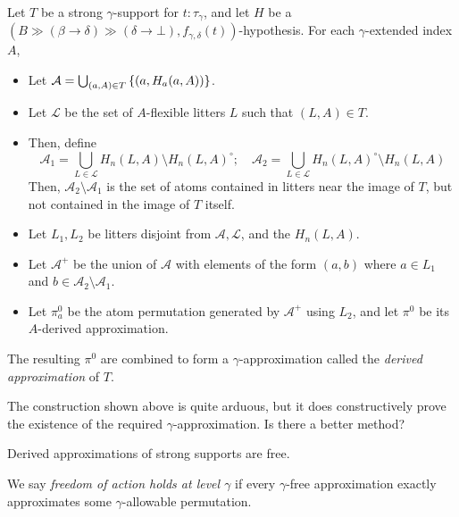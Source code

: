 \documentclass{article}
\begin{document}
\begin{definition}
    Let \( T \) be a strong \( \gamma \)-support for \( t : \tau_\gamma \), and let \( H \) be a \( (B \gg (\beta \longrightarrow \delta) \gg (\delta \longrightarrow \bot), f_{\gamma,\delta}(t)) \)-hypothesis.
    For each \( \gamma \)-extended index \( A \),
    \begin{itemize}
        \item Let \( \mathcal A = \bigcup_{(a, A) \in T} \qty{(a, H_a(a, A))} \).
        \item Let \( \mathcal L \) be the set of \( A \)-flexible litters \( L \) such that \( (L, A) \in T \).
        \item Then, define
        \[ \mathcal A_1 = \bigcup_{L \in \mathcal L} H_n(L, A) \setminus H_n(L, A)^\circ;\quad \mathcal A_2 = \bigcup_{L \in \mathcal L} H_n(L, A)^\circ \setminus H_n(L, A) \]
        Then, \( \mathcal A_2 \setminus \mathcal A_1 \) is the set of atoms contained in litters near the image of \( T \), but not contained in the image of \( T \) itself.
        \item Let \( L_1, L_2 \) be litters disjoint from \( \mathcal A, \mathcal L \), and the \( H_n(L, A) \).
        \item Let \( \mathcal A^+ \) be the union of \( \mathcal A \) with elements of the form \( (a, b) \) where \( a \in L_1 \) and \( b \in \mathcal A_2 \setminus \mathcal A_1 \).
        \item Let \( \pi^0_a \) be the atom permutation generated by \( \mathcal A^+ \) using \( L_2 \), and let \( \pi^0 \) be its \( A \)-derived approximation.
    \end{itemize}
    The resulting \( \pi^0 \) are combined to form a \( \gamma \)-approximation called the \emph{derived approximation} of \( T \).
\end{definition}
\begin{remark}
    The construction shown above is quite arduous, but it does constructively prove the existence of the required \( \gamma \)-approximation.
    Is there a better method?
\end{remark}
\begin{lemma}
    Derived approximations of strong supports are free.
\end{lemma}
\begin{definition}
    We say \emph{freedom of action holds at level \( \gamma \)} if every \( \gamma \)-free approximation exactly approximates some \( \gamma \)-allowable permutation.
\end{definition}
\end{document}
